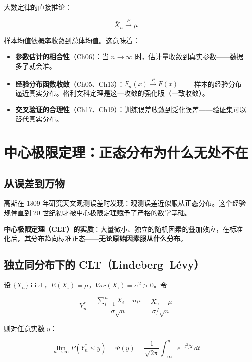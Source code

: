 \documentclass[
]{book}
\providecommand{\tightlist}{%
  \setlength{\itemsep}{0pt}\setlength{\parskip}{0pt}}
\begin{document}
大数定律的直接推论：

\[\bar{X}_n \xrightarrow{P} \mu\]

样本均值依概率收敛到总体均值。这意味着：

\begin{itemize}
\tightlist
\item
  \textbf{参数估计的相合性}（Ch06）：当 \(n \to \infty\) 时，估计量收敛到真实参数------数据多了就会准。
\item
  \textbf{经验分布函数收敛}（Ch05、Ch13）：\(F_n(x) \xrightarrow{P} F(x)\) ------样本的经验分布逼近真实分布。格利文科定理是这一收敛的强化版（一致收敛）。
\item
  \textbf{交叉验证的合理性}（Ch17、Ch19）：训练误差收敛到泛化误差------验证集可以替代真实分布。
\end{itemize}

\section{中心极限定理：正态分布为什么无处不在}\label{ux4e2dux5fc3ux6781ux9650ux5b9aux7406ux6b63ux6001ux5206ux5e03ux4e3aux4ec0ux4e48ux65e0ux5904ux4e0dux5728}

\subsection{从误差到万物}\label{ux4eceux8befux5deeux5230ux4e07ux7269}

高斯在 1809 年研究天文观测误差时发现：观测误差近似服从正态分布。这个经验规律直到 20 世纪初才被中心极限定理赋予了严格的数学基础。

\textbf{中心极限定理（CLT）的实质}：大量微小、独立的随机因素的叠加效应，在标准化后，其分布趋向标准正态------\textbf{无论原始因素服从什么分布}。

\subsection{独立同分布下的 CLT（Lindeberg--Lévy）}\label{ux72ecux7acbux540cux5206ux5e03ux4e0bux7684-cltlindebergluxe9vy}

设 \(\{X_n\}\) i.i.d.，\(E(X_i) = \mu\)，\(Var(X_i) = \sigma^2 > 0\)。令

\[Y_n^* = \frac{\sum_{i=1}^n X_i - n\mu}{\sigma\sqrt{n}} = \frac{\bar{X}_n - \mu}{\sigma / \sqrt{n}}\]

则对任意实数 \(y\)：

\[\lim_{n \to \infty} P(Y_n^* \leq y) = \Phi(y) = \frac{1}{\sqrt{2\pi}} \int_{-\infty}^y e^{-t^2/2} \, dt\]
\end{document}
